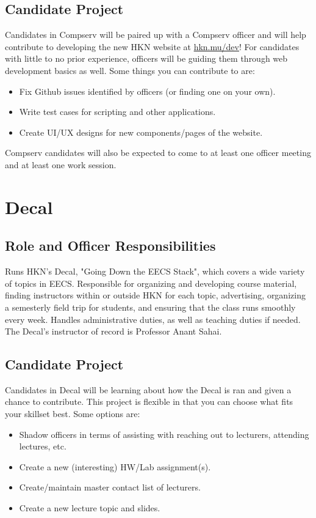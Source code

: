 \documentclass[11pt, article, oneside]{memoir}
\begin{document}
    \subsection{Candidate Project}
        Candidates in Compserv will be paired up with a Compserv officer and will help contribute to developing the new HKN website at \href{https://hkn.mu/dev}{hkn.mu/dev}! For candidates with little to no prior experience, officers will be guiding them through web development basics as well. Some things you can contribute to are:
        \begin{itemize}
            \item Fix Github issues identified by officers (or finding one on your own).
            \item Write test cases for scripting and other applications.
            \item Create UI/UX designs for new components/pages of the website.
        \end{itemize} 

        Compserv candidates will also be expected to come to at least one officer meeting and at least one work session.

    \bigbreak

    \section{Decal}
    \subsection{Role and Officer Responsibilities}
        Runs HKN's Decal, "Going Down the EECS Stack", which covers a wide variety of topics in EECS. Responsible for organizing and developing course material, finding instructors within or outside HKN for each topic, advertising, organizing a semesterly field trip for students, and ensuring that the class runs smoothly every week. Handles administrative duties, as well as teaching duties if needed. The Decal's instructor of record is Professor Anant Sahai.

    \subsection{Candidate Project}
        Candidates in Decal will be learning about how the Decal is ran and given a chance to contribute. This project is flexible in that you can choose what fits your skillset best. Some options are:
        \begin{itemize}
            \item Shadow officers in terms of assisting with reaching out to lecturers, attending lectures, etc.
            \item Create a new (interesting) HW/Lab assignment(s).
            \item Create/maintain master contact list of lecturers.
            \item Create a new lecture topic and slides.
        \end{itemize}
\end{document}
